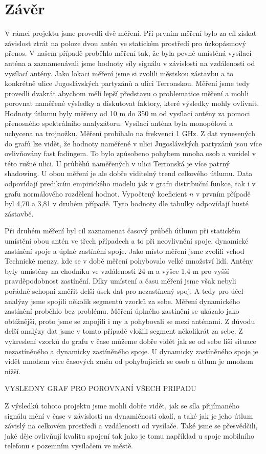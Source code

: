 \chapter*{Závěr} %
V rámci projektu jsme provedli dvě měření. Při prvním měření bylo za cíl získat závislost ztrát na poloze dvou antén ve statickém prostředí pro úzkopásmový přenos. V našem případě proběhlo měření tak, že byla pevně umístěná vysílací anténa a zaznamenávali jsme hodnoty síly signálu v závislosti na vzdálenosti od vysílací antény. Jako lokaci měření jsme si zvolili městskou zástavbu a to konkrétně ulice Jugoslávských partyzánů a ulici Terronskou. Měření jsme tedy provedli dvakrát abychom měli lepší představu o problematice měření a mohli porovnat naměřené výsledky a diskutovat faktory, které výsledky mohly ovlivnit.
Hodnoty útlumu byly měřeny od 10 m do 350 m od vysílací antény za pomoci přenosného spektrálního analyzátoru. Vysílací anténa byla monopólová a uchycena na trojnožku. Měření probíhalo na frekvenci 1 GHz. 
Z dat vynesených do grafů lze vidět, že hodnoty naměřené v ulici Jugoslávských partyzánů jsou více ovlivňovány fast fadingem. To bylo způsobeno pohybem mnoha osob a vozidel v této rušné ulici. U průběhů naměřených v ulici Terronská je více patrný shadowing. U obou měření je ale dobře viditelný trend celkového útlumu. Data odpovídají predikcím empirického modelu jak v grafu distribuční funkce, tak i v grafu normálového rozdělení hodnot. Vypočtený koeficient $n$ v prvním případě byl 4,70 a 3,81 v druhém případě. Tyto hodnoty dle tabulky odpovídají husté zástavbě.

Při druhém měření byl cíl zaznamenat časový průběh útlumu při statickém umístění obou antén ve třech případech a to při neovlivnění spoje, dynamické zastínění spoje a úplné zastínění spoje. 
Jako místo měření jsme zvolili vchod Technické menzy, kde se v době měření pohybovalo velké množství lidí. Antény byly umístěny na chodníku ve vzdálenosti 24 m a výšce 1,4 m pro vyšší pravděpodobnost zastínění. 
Díky umístení a času měření jsme však nebyli pořádně schopni změřit delší úsek dat pro nezastínený spoj. A tedy pro účel analýzy jsme spojili několik segmentů vzorků za sebe. Měření dynamického zastínění proběhlo bez problému. Měření úplného zastínění se ukázalo jako obtížnější, proto jsme se zapojili i my a pohybovali se mezi anténami. Z důvodu delší analýzy dat jsme v tomto případě vložili segment několikrát za sebe. 
Z vykreslení vzorků do grafu v čase můžeme dobře vidět jak se od sebe liší situace nezastíněného a dynamicky zastíněného spoje. U dynamicky zastíněného spoje je vidět mnohem více časových změn od pohybujících se osob a útlum je mnohem nižší.

VYSLEDNY GRAF PRO POROVNANÍ VŠECH PRIPADU

Z výsledků tohoto projektu jsme mohli dobře vidět, jak se síla přijímaného signálu mění v čase v závislosti na dynamičnosti okolí, a také jak je jeho útlum závislý na celkovém prostředí a vzdálenosti od vysílače. Také jsme se přesvědčili, jaké děje ovlivňují kvalitu spojení tak jako je tomu například u spoje mobilního telefonu s pozemním vysílačem ve městě. 